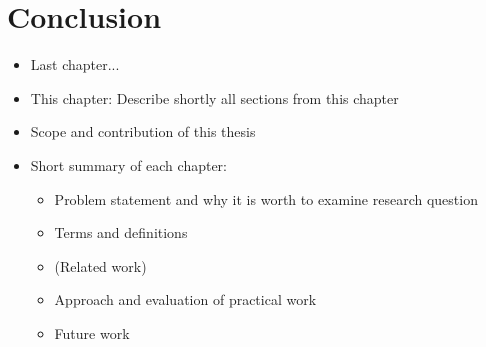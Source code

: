 \chapter{Conclusion}

\begin{itemize}
	\item Last chapter...
	\item This chapter: Describe shortly all sections from this chapter
\end{itemize}

\begin{itemize}
\item Scope and contribution of this thesis
\item Short summary of each chapter:
	\begin{itemize}
	\item Problem statement and why it is worth to examine research question
	\item Terms and definitions
	\item (Related work)
	\item Approach and evaluation of practical work
	\item Future work
	\end{itemize}
\end{itemize}